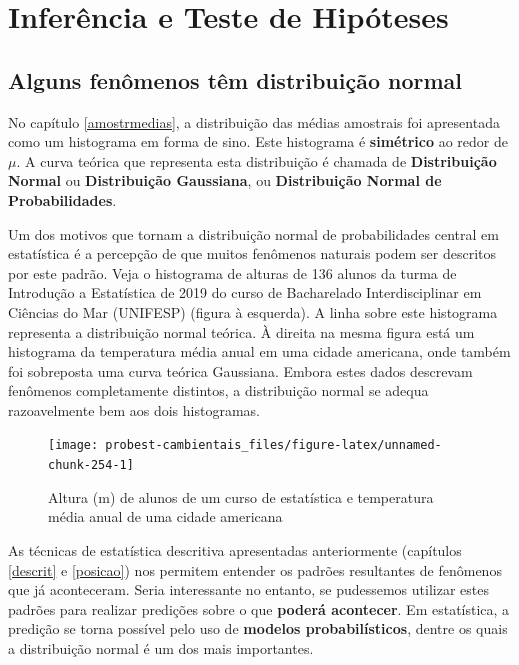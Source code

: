 \documentclass[
]{book}
\begin{document}
\hypertarget{part-inferuxeancia-e-teste-de-hipuxf3teses}{%
\part{Inferência e Teste de Hipóteses}\label{part-inferuxeancia-e-teste-de-hipuxf3teses}}

\hypertarget{normdist}{%
\chapter{Alguns fenômenos têm distribuição normal}\label{normdist}}

No capítulo \ref{amostrmedias}, a distribuição das médias amostrais foi apresentada como um histograma em forma de sino. Este histograma é \textbf{simétrico} ao redor de \(\mu\). A curva teórica que representa esta distribuição é chamada de \textbf{Distribuição Normal} ou \textbf{Distribuição Gaussiana}, ou \textbf{Distribuição Normal de Probabilidades}.

Um dos motivos que tornam a distribuição normal de probabilidades central em estatística é a percepção de que muitos fenômenos naturais podem ser descritos por este padrão. Veja o histograma de alturas de 136 alunos da turma de Introdução a Estatística de 2019 do curso de Bacharelado Interdisciplinar em Ciências do Mar (UNIFESP) (figura à esquerda). A linha sobre este histograma representa a distribuição normal teórica. À direita na mesma figura está um histograma da temperatura média anual em uma cidade americana, onde também foi sobreposta uma curva teórica Gaussiana. Embora estes dados descrevam fenômenos completamente distintos, a distribuição normal se adequa razoavelmente bem aos dois histogramas.

\begin{figure}

{\centering \texttt{[image: probest-cambientais\_files/figure-latex/unnamed-chunk-254-1]} 

}

\caption{Altura (m) de alunos de um curso de estatística e temperatura média anual de uma cidade americana}\label{fig:unnamed-chunk-254}
\end{figure}

As técnicas de estatística descritiva apresentadas anteriormente (capítulos \ref{descrit} e \ref{posicao}) nos permitem entender os padrões resultantes de fenômenos que já aconteceram. Seria interessante no entanto, se pudessemos utilizar estes padrões para realizar predições sobre o que \textbf{poderá acontecer}. Em estatística, a predição se torna possível pelo uso de \textbf{modelos probabilísticos}, dentre os quais a distribuição normal é um dos mais importantes.
\end{document}
